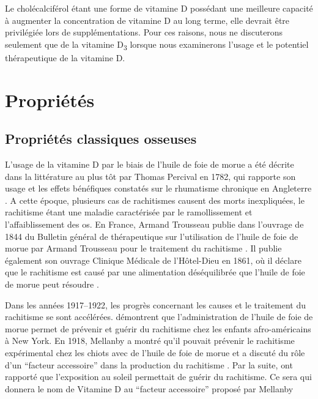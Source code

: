 \documentclass[
  a4paper,
  DIV=11,
  numbers=noendperiod,
  listof=totoc]{scrreprt}
\begin{document}
Le cholécalciférol étant une forme de vitamine D possédant une meilleure
capacité à augmenter la concentration de vitamine D au long terme, elle
devrait être privilégiée lors de supplémentations. Pour ces raisons,
nous ne discuterons seulement que de la vitamine D\textsubscript{3}
lorsque nous examinerons l'usage et le potentiel thérapeutique de la
vitamine D.

\section{Propriétés}\label{propriuxe9tuxe9s}

\subsection{Propriétés classiques
osseuses}\label{propriuxe9tuxe9s-classiques-osseuses}

L'usage de la vitamine D par le biais de l'huile de foie de morue a été
décrite dans la littérature au plus tôt par Thomas Percival en 1782, qui
rapporte son usage et les effets bénéfiques constatés sur le rhumatisme
chronique en Angleterre \autocite{Percival.1782}. A cette époque,
plusieurs cas de rachitismes causent des morts inexpliquées, le
rachitisme étant une maladie caractérisée par le ramollissement et
l'affaiblissement des os. En France, Armand Trousseau publie dans
l'ouvrage de 1844 du Bulletin général de thérapeutique sur l'utilisation
de l'huile de foie de morue par Armand Trousseau pour le traitement du
rachitisme \autocite{bulletin.label.1844}. Il publie également son
ouvrage Clinique Médicale de l'Hôtel-Dieu en 1861, où il déclare que le
rachitisme est causé par une alimentation déséquilibrée que l'huile de
foie de morue peut résoudre \autocite{Hernigou.2019}.

Dans les années 1917--1922, les progrès concernant les causes et le
traitement du rachitisme se sont accélérées. \textcite{Hess.1917.lc}
démontrent que l'administration de l'huile de foie de morue permet de
prévenir et guérir du rachitisme chez les enfants afro-américains à New
York. En 1918, Mellanby a montré qu'il pouvait prévenir le rachitisme
expérimental chez les chiots avec de l'huile de foie de morue et a
discuté du rôle d'un ``facteur accessoire'' dans la production du
rachitisme \autocite{ORiordan.2014}. Par la suite, \textcite{Hess.1921}
ont rapporté que l'exposition au soleil permettait de guérir du
rachitisme. Ce sera \textcite{McCollum.1922} qui donnera le nom de
Vitamine D au ``facteur accessoire'' proposé par Mellanby
\autocite{Hernigou.2019,Mavrotas.2021}
\end{document}
